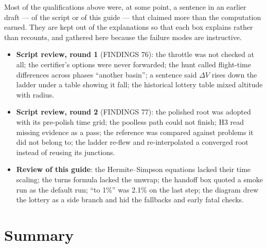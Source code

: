 \documentclass[11pt]{article}
\begin{document}
Most of the qualifications above were, at some point, a sentence in an
earlier draft --- of the script or of this guide --- that claimed more than
the computation earned. They are kept out of the explanations so that each
box explains rather than recounts, and gathered here because the failure
modes are instructive.

\begin{itemize}[nosep]
\item \textbf{Script review, round 1} (FINDINGS 76): the throttle was not
      checked at all; the certifier's options were never forwarded; the hunt
      called flight-time differences across phases ``another basin''; a
      sentence said $\Delta V$ rises down the ladder under a table showing it
      fall; the historical lottery table mixed altitude with radius.
\item \textbf{Script review, round 2} (FINDINGS 77): the polished root was
      adopted with its pre-polish time grid; the poolless path could not
      finish; H3 read missing evidence as a pass; the reference was compared
      against problems it did not belong to; the ladder re-flew and
      re-interpolated a converged root instead of reusing its junctions.
\item \textbf{Review of this guide}: the Hermite--Simpson equations lacked
      their time scaling; the turns formula lacked the unwrap; the handoff
      box quoted a smoke run as the default run; ``to 1\%'' was 2.1\% on the
      last step; the diagram drew the lottery as a side branch and hid the
      fallbacks and early fatal checks.
\end{itemize}

\section{Summary}
\end{document}
